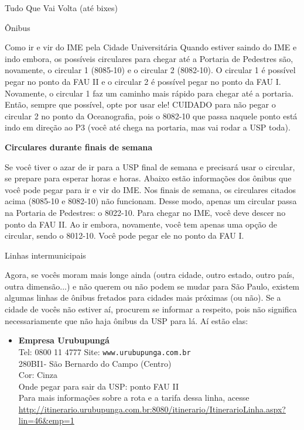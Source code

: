 \begin{secao}{Tudo Que Vai Volta (até bixes)}
\begin{subsecao}{Ônibus}
\begin{subsubsecao}{Como ir e vir do IME pela Cidade Universitária}
Quando estiver saindo do IME e indo embora, os possíveis circulares para chegar até a
Portaria de Pedestres são, novamente, o circular 1 (8085-10) e o circular 2 (8082-10).
O circular 1 é possível pegar no ponto da FAU II e o circular 2 é possível pegar no ponto
da FAU I. Novamente, o circular 1 faz um caminho mais rápido para chegar até a portaria. 
Então, sempre que possível, opte por usar ele! CUIDADO para não pegar o circular 2 no 
ponto da Oceanografia, pois o 8082-10 que passa naquele ponto está indo em direção ao P3
(você até chega na portaria, mas vai rodar a USP toda).


{\bf Circulares durante finais de semana}

Se você tiver o azar de ir para a USP final de semana e precisará usar o circular, se prepare
para esperar horas e horas. Abaixo estão informações dos ônibus que você pode pegar
para ir e vir do IME.
Nos finais de semana, os circulares citados acima (8085-10 e 8082-10) não funcionam. 
Desse modo, apenas um circular passa na Portaria de Pedestres: o 8022-10. 
Para chegar no IME, você deve descer no ponto da FAU II.
Ao ir embora, novamente, você tem apenas uma opção de circular, sendo o 
8012-10. Você pode pegar ele no ponto da FAU I. 

\end{subsubsecao}

\begin{subsubsecao}{Linhas intermunicipais}

Agora, se vocês moram mais longe ainda (outra cidade, outro estado, outro país,
outra dimensão...) e não querem ou não podem se mudar para São Paulo, existem
algumas linhas de ônibus fretados para cidades mais próximas (ou não). Se a
cidade de vocês não estiver aí, procurem se informar a respeito, pois não
significa necessariamente que não haja ônibus da USP para lá. Aí estão elas:

\begin{itemize}
  \item {\bf Empresa Urubupungá}\\
    Tel: 0800 11 4777
    Site: {\tt www.urubupunga.com.br}\\
    280BI1- São Bernardo do Campo (Centro)\\
    Cor: Cinza\\
    Onde pegar para sair da USP: ponto FAU II\\
    Para mais informações sobre a rota e a tarifa dessa linha, acesse
    \url{http://itinerario.urubupunga.com.br:8080/itinerario/ItinerarioLinha.aspx?lin=46\&emp=1}


\end{itemize}
\end{subsubsecao}
\end{subsecao}
\end{secao}
